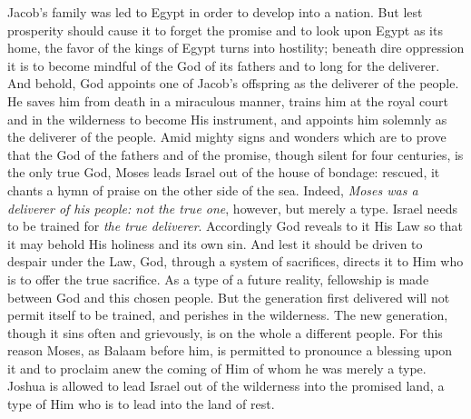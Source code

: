 Jacob’s family was led to Egypt in order to develop into a nation. But lest prosperity should cause it to forget the promise and to look upon Egypt as its home, the favor of the kings of Egypt turns into hostility; beneath dire oppression it is to become mindful of the God of its fathers and to long for the deliverer. And behold, God appoints one of Jacob’s offspring as the deliverer of the people. He saves him from death in a miraculous manner, trains him at the royal court and in the wilderness to become His instrument, and appoints him solemnly as the deliverer of the people. Amid mighty signs and wonders which are to prove that the God of the fathers
and of the promise, though silent for four centuries, is the only true God, Moses leads Israel out of the house of bondage: rescued, it chants a hymn of praise on the other side of the sea. Indeed, \emph{Moses was a deliverer of his people: not the true one}, however, but merely a type. Israel needs to be trained for \emph{the true deliverer}. Accordingly God reveals to it His Law so that it may behold His holiness and its own sin. And lest it should be driven to despair under the Law, God, through a system of sacrifices, directs it to Him who is to offer the true sacrifice. As a type of a future reality, fellowship is made between God and this chosen people. But the generation first delivered will not permit itself to be trained, and perishes in the wilderness. The new generation, though it sins often and grievously, is on the whole a different people. For this reason Moses, as Balaam before him, is permitted to pronounce a blessing upon it and to proclaim anew the coming of Him of whom he was merely a type. Joshua is allowed to lead Israel out of the wilderness into the promised land, a type of Him who is to lead into the land of rest.

